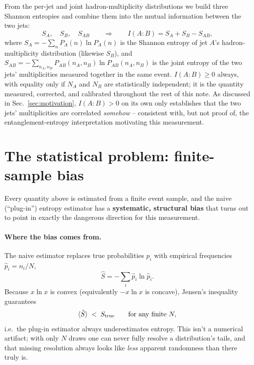 \documentclass[11pt]{article}
\newcommand{\Strue}{S_{\rm true}}
\begin{document}
From the per-jet and joint hadron-multiplicity distributions we build
three Shannon entropies and combine them into the mutual information
between the two jets:
\begin{equation}
S_A,\quad S_B,\quad S_{AB}
\qquad\Longrightarrow\qquad
I(A{:}B) = S_A+S_B-S_{AB},
\end{equation}
where $S_A = -\sum_n P_A(n)\ln P_A(n)$ is the Shannon entropy of jet
$A$'s hadron-multiplicity distribution (likewise $S_B$), and $S_{AB} =
-\sum_{n_A,n_B} P_{AB}(n_A,n_B)\ln P_{AB}(n_A,n_B)$ is the joint entropy
of the two jets' multiplicities measured together in the same event.
$I(A{:}B)\geq0$ always, with equality only if $N_A$ and $N_B$ are
statistically independent; it is the quantity measured, corrected, and
calibrated throughout the rest of this note. As discussed in
Sec.~\ref{sec:motivation}, $I(A{:}B)>0$ on its own only establishes that
the two jets' multiplicities are correlated \emph{somehow} -- consistent
with, but not proof of, the entanglement-entropy interpretation
motivating this measurement.

\section{The statistical problem: finite-sample bias}
\label{sec:bias}

Every quantity above is estimated from a finite event sample, and the
naive (``plug-in'') entropy estimator has a \textbf{systematic, structural
bias} that turns out to point in exactly the dangerous direction for this
measurement.

\paragraph{Where the bias comes from.} The naive estimator replaces true
probabilities $p_i$ with empirical frequencies $\hat p_i=n_i/N$,
\begin{equation}
\hat S = -\sum_i \hat p_i \ln \hat p_i .
\end{equation}
Because $x\ln x$ is convex (equivalently $-x\ln x$ is concave), Jensen's
inequality guarantees
\begin{equation}
\langle \hat S \rangle \;<\; \Strue \qquad \text{for any finite } N,
\end{equation}
i.e.\ the plug-in estimator always underestimates entropy. This isn't a
numerical artifact; with only $N$ draws one can never fully resolve a
distribution's tails, and that missing resolution always looks like
\emph{less} apparent randomness than there truly is.
\end{document}
